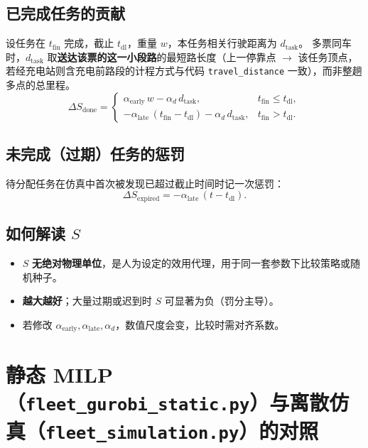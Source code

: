 \documentclass[UTF8,a4paper]{ctexart}
\begin{document}
\subsection{已完成任务的贡献}
设任务在 $t_{\mathrm{fin}}$ 完成，截止 $t_{\mathrm{dl}}$，重量 $w$，本任务相关行驶距离为 $d_{\mathrm{task}}$。
多票同车时，$d_{\mathrm{task}}$ 取\textbf{送达该票的这一小段路}的最短路长度（上一停靠点 $\to$ 该任务顶点，若经充电站则含充电前路段的计程方式与代码 \texttt{travel\_distance} 一致），而非整趟多点的总里程。
\begin{equation}
  \Delta S_{\mathrm{done}} =
  \begin{cases}
    \alpha_{\mathrm{early}}\, w - \alpha_{d}\, d_{\mathrm{task}}, & t_{\mathrm{fin}} \le t_{\mathrm{dl}},\\[0.5em]
    -\alpha_{\mathrm{late}}\,(t_{\mathrm{fin}}-t_{\mathrm{dl}}) - \alpha_{d}\, d_{\mathrm{task}}, & t_{\mathrm{fin}} > t_{\mathrm{dl}}.
  \end{cases}
\end{equation}

\subsection{未完成（过期）任务的惩罚}
待分配任务在仿真中首次被发现已超过截止时间时记一次惩罚：
\begin{equation}
  \Delta S_{\mathrm{expired}} = -\alpha_{\mathrm{late}}\,(t-t_{\mathrm{dl}}).
\end{equation}

\subsection[如何解读得分]{如何解读 $S$}
\begin{itemize}
  \item $S$ \textbf{无绝对物理单位}，是人为设定的效用代理，用于同一套参数下比较策略或随机种子。
  \item \textbf{越大越好}；大量过期或迟到时 $S$ 可显著为负（罚分主导）。
  \item 若修改 $\alpha_{\mathrm{early}},\alpha_{\mathrm{late}},\alpha_{d}$，数值尺度会变，比较时需对齐系数。
\end{itemize}

\section[静态 MILP 与离散仿真对照]{静态 MILP（\texttt{fleet\_gurobi\_static.py}）与离散仿真（\texttt{fleet\_simulation.py}）的对照}
\label{sec:gurobi-compare}
\end{document}
